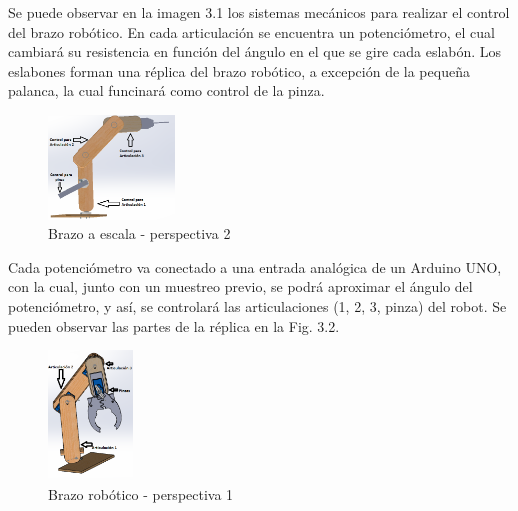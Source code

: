\documentclass[gra_conf.tex]{subfiles}
\begin{document}
\begin{figure}[h]
\end{figure}

Se puede observar en la imagen 3.1 los sistemas mecánicos para realizar
el control del brazo robótico. En cada articulación se encuentra un 
potenciómetro, el cual cambiará su resistencia en función del ángulo
en el  que se gire cada eslabón. Los eslabones forman una réplica del
brazo robótico, a excepción de la pequeña palanca, la cual funcinará
como control de la pinza.

\begin{figure}[h]
  \centering
  \includegraphics[width=0.3\textwidth]{../img/Replica2.png}
  \caption{Brazo a escala - perspectiva 2}
  \label{brazo_replica2}
\end{figure}

Cada potenciómetro va conectado a una entrada analógica de un Arduino UNO, 
con la cual, junto con un muestreo previo, se podrá aproximar el ángulo del 
potenciómetro, y así, se controlará las articulaciones (1, 2, 3, pinza) del 
robot. Se pueden observar las partes de la réplica en la Fig. 3.2.

\begin{figure}[h]
  \centering
  \includegraphics[width=0.2\textwidth]{../img/Brazo1.png}
  \caption{Brazo robótico - perspectiva 1}
  \label{brazo1}
\end{figure}
\end{document}
